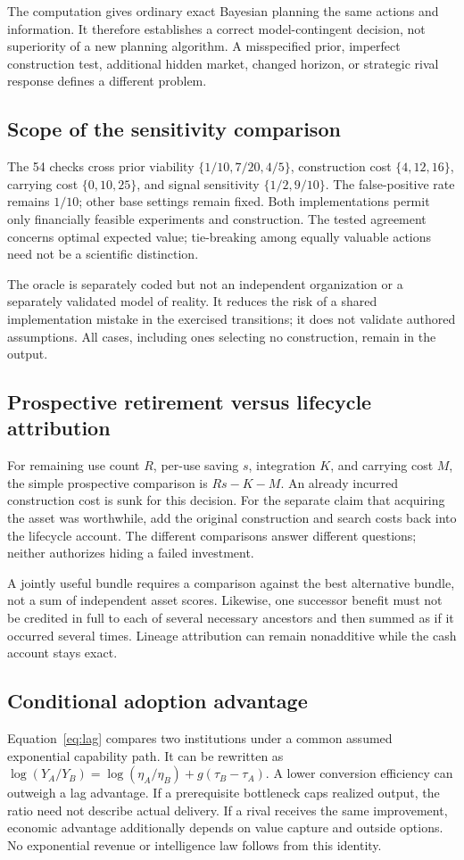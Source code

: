 \documentclass[11pt,letterpaper]{article}
\theoremstyle{remark}\newtheorem{remark}{Remark}[section]
\begin{document}
The computation gives ordinary exact Bayesian planning the same actions and information. It therefore establishes a correct model-contingent decision, not superiority of a new planning algorithm. A misspecified prior, imperfect construction test, additional hidden market, changed horizon, or strategic rival response defines a different problem.

\subsection{Scope of the sensitivity comparison}
The 54 checks cross prior viability $\{1/10,7/20,4/5\}$, construction cost $\{4,12,16\}$, carrying cost $\{0,10,25\}$, and signal sensitivity $\{1/2,9/10\}$. The false-positive rate remains $1/10$; other base settings remain fixed. Both implementations permit only financially feasible experiments and construction. The tested agreement concerns optimal expected value; tie-breaking among equally valuable actions need not be a scientific distinction.

The oracle is separately coded but not an independent organization or a separately validated model of reality. It reduces the risk of a shared implementation mistake in the exercised transitions; it does not validate authored assumptions. All cases, including ones selecting no construction, remain in the output.

\subsection{Prospective retirement versus lifecycle attribution}
For remaining use count $R$, per-use saving $s$, integration $K$, and carrying cost $M$, the simple prospective comparison is $Rs-K-M$. An already incurred construction cost is sunk for this decision. For the separate claim that acquiring the asset was worthwhile, add the original construction and search costs back into the lifecycle account. The different comparisons answer different questions; neither authorizes hiding a failed investment.

A jointly useful bundle requires a comparison against the best alternative bundle, not a sum of independent asset scores. Likewise, one successor benefit must not be credited in full to each of several necessary ancestors and then summed as if it occurred several times. Lineage attribution can remain nonadditive while the cash account stays exact.

\subsection{Conditional adoption advantage}
Equation~\eqref{eq:lag} compares two institutions under a common assumed exponential capability path. It can be rewritten as $\log(Y_A/Y_B)=\log(\eta_A/\eta_B)+g(\tau_B-\tau_A)$. A lower conversion efficiency can outweigh a lag advantage. If a prerequisite bottleneck caps realized output, the ratio need not describe actual delivery. If a rival receives the same improvement, economic advantage additionally depends on value capture and outside options. No exponential revenue or intelligence law follows from this identity.
\end{document}
